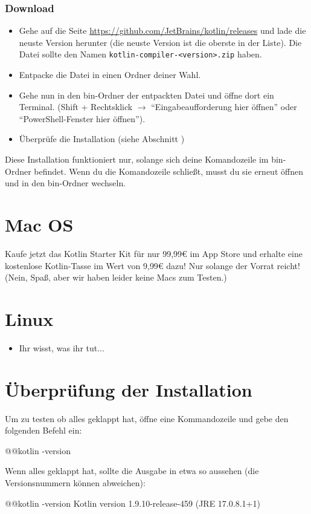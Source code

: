 \subsubsection*{Download}
\begin{itemize}
    \item Gehe auf die Seite \url{https://github.com/JetBrains/kotlin/releases} und lade die neuste Version herunter (die neuste Version ist die oberste in der Liste). Die Datei sollte den Namen \texttt{kotlin-compiler-<version>.zip} haben. 
    \item Entpacke die Datei in einen Ordner deiner Wahl. 
    \item Gehe nun in den bin-Ordner der entpackten Datei und öffne dort ein Terminal. (Shift + Rechtsklick $\rightarrow$ \enquote{Eingabeaufforderung hier öffnen} oder \enquote{PowerShell-Fenster hier öffnen}).
    \item Überprüfe die Installation (siehe Abschnitt )
\end{itemize}
\begin{hinweis}
    Diese Installation funktioniert nur, solange sich deine Komandozeile im bin-Ordner befindet. Wenn du die Komandozeile schließt, musst du sie erneut öffnen und in den bin-Ordner wechseln.
\end{hinweis}
\section*{Mac OS}
Kaufe jetzt das Kotlin Starter Kit für nur 99,99€ im App Store und erhalte eine kostenlose Kotlin-Tasse im Wert von 9,99€ dazu! Nur solange der Vorrat reicht! (Nein, Spaß, aber wir haben leider keine Macs zum Testen.)

\section*{Linux}
\begin{itemize}
    \item Ihr wisst, was ihr tut...
\end{itemize}

\section*{Überprüfung der Installation}\label{sec:check}
Um zu testen ob alles geklappt hat, öffne eine Kommandozeile und gebe den folgenden Befehl ein:
\begin{commandshell}
    @\shellprefix{}@kotlin -version
\end{commandshell}

Wenn alles geklappt hat, sollte die Ausgabe in etwa so aussehen (die Versionsnummern können abweichen):
\begin{commandshell}[][]
    @\shellprefix{}@kotlin -version
        Kotlin version 1.9.10-release-459 (JRE 17.0.8.1+1)
\end{commandshell}


